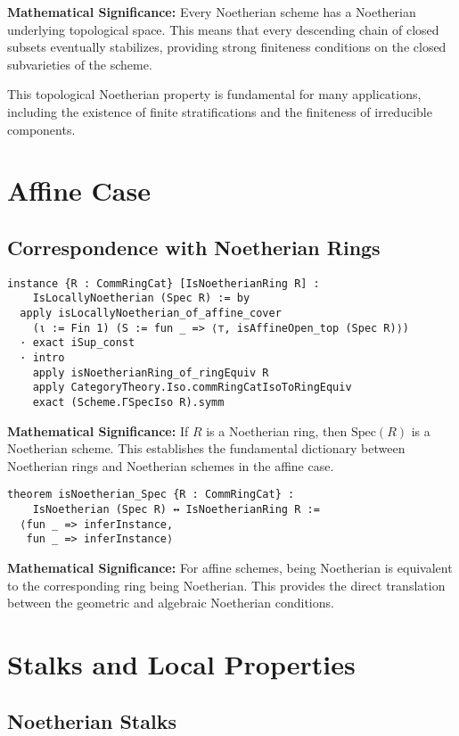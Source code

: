 \documentclass{article}
\theoremstyle{definition}
\begin{document}
\textbf{Mathematical Significance:} Every Noetherian scheme has a Noetherian underlying topological space. This means that every descending chain of closed subsets eventually stabilizes, providing strong finiteness conditions on the closed subvarieties of the scheme.

This topological Noetherian property is fundamental for many applications, including the existence of finite stratifications and the finiteness of irreducible components.

\section{Affine Case}

\subsection{Correspondence with Noetherian Rings}

\begin{lstlisting}
instance {R : CommRingCat} [IsNoetherianRing R] :
    IsLocallyNoetherian (Spec R) := by
  apply isLocallyNoetherian_of_affine_cover
    (ι := Fin 1) (S := fun _ => ⟨⊤, isAffineOpen_top (Spec R)⟩)
  · exact iSup_const
  · intro
    apply isNoetherianRing_of_ringEquiv R
    apply CategoryTheory.Iso.commRingCatIsoToRingEquiv
    exact (Scheme.ΓSpecIso R).symm
\end{lstlisting}

\textbf{Mathematical Significance:} If $R$ is a Noetherian ring, then $\mathrm{Spec}(R)$ is a Noetherian scheme. This establishes the fundamental dictionary between Noetherian rings and Noetherian schemes in the affine case.

\begin{lstlisting}
theorem isNoetherian_Spec {R : CommRingCat} :
    IsNoetherian (Spec R) ↔ IsNoetherianRing R :=
  ⟨fun _ => inferInstance,
   fun _ => inferInstance⟩
\end{lstlisting}

\textbf{Mathematical Significance:} For affine schemes, being Noetherian is equivalent to the corresponding ring being Noetherian. This provides the direct translation between the geometric and algebraic Noetherian conditions.

\section{Stalks and Local Properties}

\subsection{Noetherian Stalks}
\end{document}
